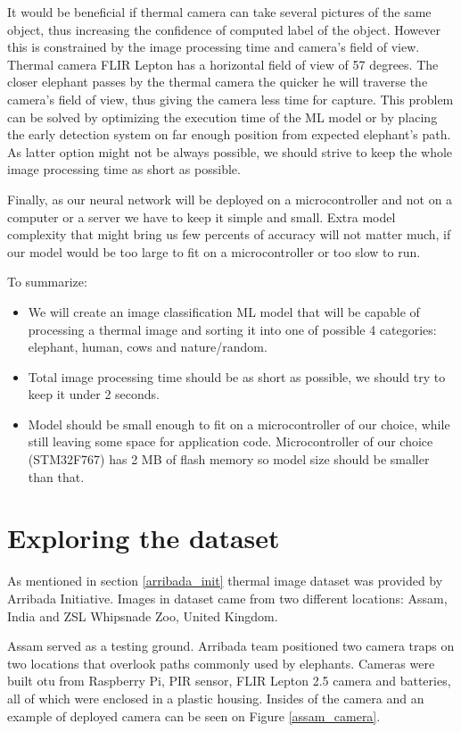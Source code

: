 It would be beneficial if thermal camera can take several pictures of the same object, thus increasing the confidence of computed label of the object.
However this is constrained by the image processing time and camera's field of view.
Thermal camera FLIR Lepton has a horizontal field of view of 57 degrees.
The closer elephant passes by the thermal camera the quicker he will traverse the camera's field of view, thus giving the camera less time for capture.
This problem can be solved by optimizing the execution time of the ML model or by placing the early detection system on far enough position from expected elephant's path.
As latter option might not be always possible, we should strive to keep the whole image processing time as short as possible.

Finally, as our neural network will be deployed on a microcontroller and not on a computer or a server we have to keep it simple and small.
Extra model complexity that might bring us few percents of accuracy will not matter much, if our model would be too large to fit on a microcontroller or too slow to run.


To summarize:
\begin{itemize}
    \item We will create an image classification ML model that will be capable of processing a thermal image and sorting it into one of possible 4 categories: elephant, human, cows and nature/random.
    \item Total image processing time should be as short as possible, we should try to keep it under 2 seconds.
    \item Model should be small enough to fit on a microcontroller of our choice, while still leaving some space for application code. Microcontroller of our choice (STM32F767) has 2 MB of flash memory so model size should be smaller than that.
\end{itemize}


\section{ Exploring the dataset} \label{exploring_dataset}

As mentioned in section \ref{arribada_init} thermal image dataset was provided by Arribada Initiative\cite{wildlabs-winners}\cite{arribada-assam}.
Images in dataset came from two different locations: Assam, India and ZSL Whipsnade Zoo, United Kingdom.

Assam served as a testing ground.
Arribada team positioned two camera traps on two locations that overlook paths commonly used by elephants.
Cameras were built otu from Raspberry Pi, PIR sensor, FLIR Lepton 2.5 camera and batteries, all of which were enclosed in a plastic housing.
Insides of the camera and an example of deployed camera can be seen on Figure \ref{assam_camera}.

